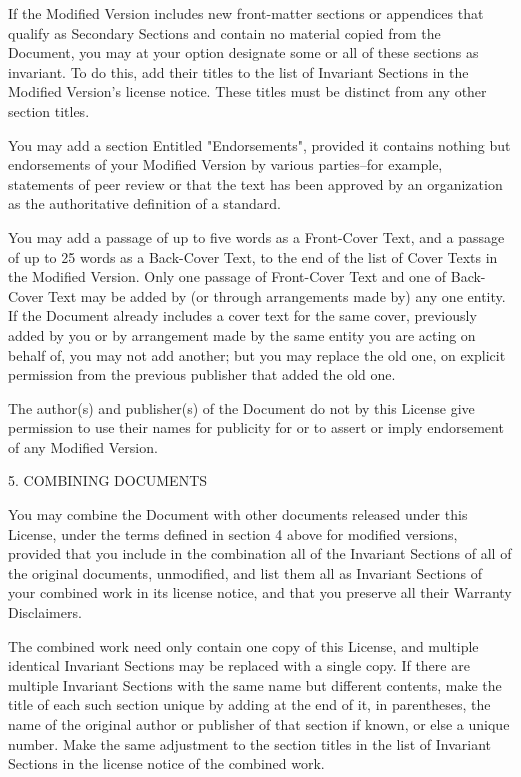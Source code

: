 \documentclass{article}
\begin{document}
If the Modified Version includes new front-matter sections or appendices that qualify as Secondary Sections and contain no material copied from the Document, you may at your option designate some or all of these sections as invariant. To do this, add their titles to the list of Invariant Sections in the Modified Version's license notice. These titles must be distinct from any other section titles. 

You may add a section Entitled "Endorsements", provided it contains nothing but endorsements of your Modified Version by various parties--for example, statements of peer review or that the text has been approved by an organization as the authoritative definition of a standard. 

You may add a passage of up to five words as a Front-Cover Text, and a passage of up to 25 words as a Back-Cover Text, to the end of the list of Cover Texts in the Modified Version.  Only one passage of Front-Cover Text and one of Back-Cover Text may be added by (or through  arrangements made by) any one entity. If the Document already includes a cover text for the same cover, previously added by you or by arrangement made by the same entity you are acting on behalf of, you may not add another; but you may replace the old one, on explicit permission from the previous publisher that added the old one. 

The author(s) and publisher(s) of the Document do not by this License give permission to use their names for publicity for or to assert or imply endorsement of any Modified Version. 

5. COMBINING DOCUMENTS 

You may combine the Document with other documents released under this License, under the terms defined in section 4 above for modified versions, provided that you include in the combination all of the Invariant Sections of all of the original documents, unmodified, and list them all as Invariant Sections of your combined work in its license notice, and that you preserve all their Warranty Disclaimers. 

The combined work need only contain one copy of this License, and multiple identical Invariant Sections may be replaced with a single copy. If there are multiple Invariant Sections with the same name but different contents, make the title of each such section unique by adding at the end of it, in parentheses, the name of the original author or publisher of that section if known, or else a unique number. Make the same adjustment to the section titles in the list of Invariant Sections in the license notice of the combined work. 
\end{document}
